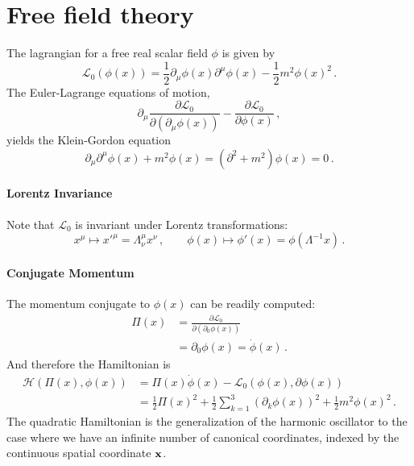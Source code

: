 
\section{Free field theory}
\label{sec:real-scalar-field}

The lagrangian for a free real scalar field $\phi$ is given by
\begin{equation}
  \label{eq:RealScalLagr}
  \mathcal{L}_0\left(\phi(x)\right)=
  \frac12 \partial_\mu \phi(x) \partial^\mu \phi(x) - 
  \frac12 m^2 \phi(x)^2\, .
\end{equation}
The Euler-Lagrange equations of motion, 
\begin{equation}
  \label{eq:EulerLagrange}
  \partial_\mu \frac{\partial \mathcal{L}_0}{\partial\left(\partial_\mu \phi(x)\right)} 
  - \frac{\partial \mathcal{L}_0}{\partial \phi(x)}\, ,
\end{equation}
yields the Klein-Gordon equation
\begin{equation}
  \label{eq:KleinGordonScal}
  \partial_\mu \partial^\mu \phi(x) + m^2 \phi(x) = \left( \partial^2 + m^2 \right) \phi(x) = 0\, . 
\end{equation}

\paragraph{Lorentz Invariance}

Note that $\mathcal{L}_0$ is invariant under Lorentz transformations:
\begin{equation}
  \label{eq:LorentzTransfScal}
  x^\mu \mapsto x'^\mu =  \Lambda^\mu_\nu x^\nu\, , \quad \quad 
  \phi(x) \mapsto \phi'(x) = \phi(\Lambda^{-1}x)\, .
\end{equation}

\paragraph{Conjugate Momentum} 

The momentum conjugate to $\phi(x)$ can be readily computed:
\begin{align}
  \label{eq:ScalMom}
  \Pi(x) &= \frac{\partial \mathcal{L}_0}{\partial (\partial_0\phi(x))} \\
  &= \partial_0 \phi(x) = \dot{\phi}(x)\, .
\end{align}
And therefore the Hamiltonian is 
\begin{align}
  \mathcal{H}\left(\Pi(x),\phi(x)\right) &= \Pi(x) \dot{\phi}(x) - \mathcal{L}_0\left(\phi(x),\partial\phi(x)\right) \\
  &= \frac12 \Pi(x)^2 + \frac12 \sum_{k=1}^3 \left(\partial_k \phi(x)\right)^2
    + \frac12 m^2 \phi(x)^2\, .
\end{align}
The quadratic Hamiltonian is the generalization of the harmonic oscillator to the case where we have an infinite number of canonical coordinates, indexed by the continuous spatial coordinate ${\mathbf x}$. 

